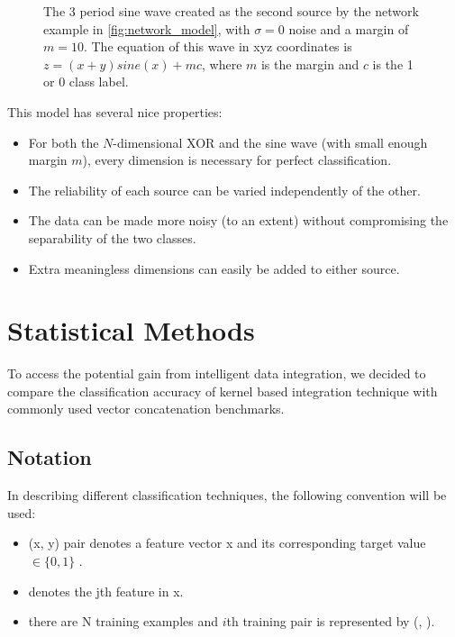 \documentclass{article}
\begin{document}
\begin{figure}
\begin{minipage}{.5\textwidth}
    \caption{The 3 period sine wave created as the second source by the network
        example in \ref{fig:network_model}, with $\sigma=0$ noise and a margin of
        $m=10$. The equation of this wave in xyz coordinates is $z =
        (x+y)sine(x) + mc$, where $m$ is the margin and $c$ is the 1 or 0 class
        label.}
    \label{fig:sine_wave}
\end{minipage}
\end{figure}

This model has several nice properties:
\begin{itemize}
    \item For both the $N$-dimensional XOR and the sine wave (with small enough
        margin $m$), every dimension is necessary for perfect classification.
    \item The reliability of each source can be varied independently of the
        other.
    \item The data can be made more noisy (to an extent) without
        compromising the separability of the two classes.
    \item Extra meaningless dimensions can easily be added to either source.
\end{itemize}












\section*{Statistical Methods}

To access the potential gain from intelligent data integration, we decided to compare the classification accuracy of kernel based integration technique with commonly used vector concatenation benchmarks.

\subsection*{Notation}
In describing different classification techniques, the following convention will be used:
\begin{itemize}
\setlength\itemsep{0em}
\item (x, y) pair denotes a feature vector x \mmin {} and its corresponding target value $\in \{0, 1\}$ .
\item {} denotes the jth feature in x.
\item there are N training examples and $i$th training pair is represented by (,  ).
\end{itemize}
\end{document}
